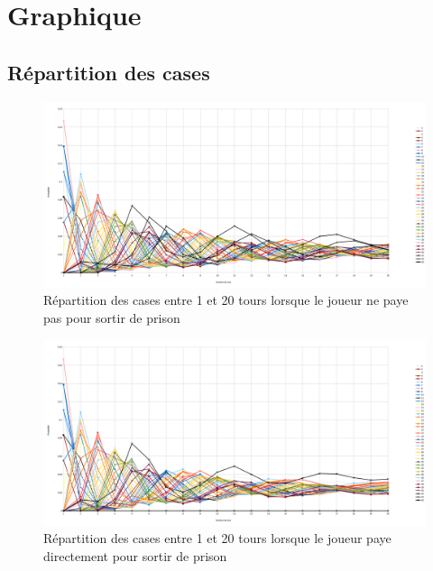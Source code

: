 \documentclass[letterpaper]{article}
\begin{document}
    \section{Graphique}
      \label{annexe:graphe}
      \subsection{Répartition des cases}
	\begin{center}
	  \begin{figure}[bp!]
	    \includegraphics[scale=0.26]{./Images/GraphRepPayePasLeq20.png}
	    \caption{\label{graph_result_paye_pas} Répartition des cases entre 1 et 20 tours lorsque le joueur ne paye pas pour sortir de prison}
	  \end{figure}
	  
	  \begin{figure}[bp!]
	    \includegraphics[scale=0.26]{./Images/GraphRepPayeLeq20.png}
	    \caption{\label{graph_result_paye} Répartition des cases entre 1 et 20 tours lorsque le joueur paye directement pour sortir de prison}
	  \end{figure}
	  

\end{center}
\end{document}
